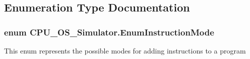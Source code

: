 \subsection{Enumeration Type Documentation}
\hypertarget{namespace_c_p_u___o_s___simulator_adc17a5a5e004084f05dc8e4d3f70e31f}{}
\subsubsection[{Enum\+Instruction\+Mode}]{\setlength{\rightskip}{0pt plus 5cm}enum {\bf C\+P\+U\+\_\+\+O\+S\+\_\+\+Simulator.\+Enum\+Instruction\+Mode}\hspace{0.3cm}{\ttfamily [strong]}}\label{namespace_c_p_u___o_s___simulator_adc17a5a5e004084f05dc8e4d3f70e31f}


This enum represents the possible modes for adding instructions to a program 

